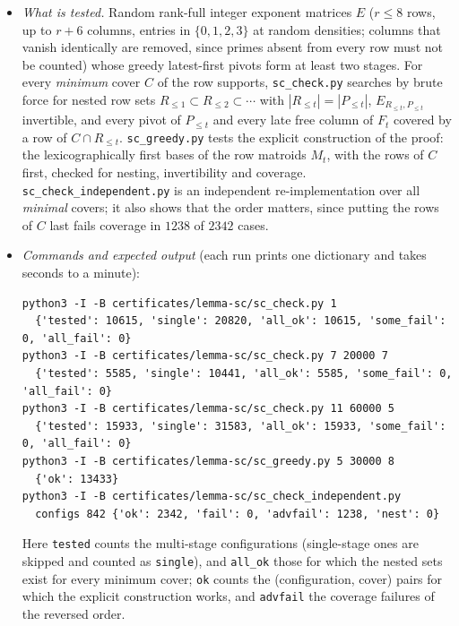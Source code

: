 \begin{itemize}
\item \emph{What is tested.} Random rank-full integer exponent matrices $E$ ($r\le8$ rows, up to $r+6$ columns, entries in
$\{0,1,2,3\}$ at random densities; columns that vanish identically are removed, since primes absent from every row must not be
counted) whose greedy latest-first pivots form at least two stages. For every \emph{minimum} cover $C$ of the row supports,
\texttt{sc\_check.py} searches by brute force for nested row sets $R_{\le1}\subset R_{\le2}\subset\cdots$ with
$|R_{\le t}|=|P_{\le t}|$, $E_{R_{\le t},P_{\le t}}$ invertible, and every pivot of $P_{\le t}$ and every late free column of $F_t$ covered
by a row of $C\cap R_{\le t}$. \texttt{sc\_greedy.py} tests the explicit construction of the proof: the lexicographically first
bases of the row matroids $M_t$, with the rows of $C$ first, checked for nesting, invertibility and coverage.
\texttt{sc\_check\_independent.py} is an independent re-implementation over all \emph{minimal} covers; it also shows that the order
matters, since putting the rows of $C$ last fails coverage in $1238$ of $2342$ cases.
\item \emph{Commands and expected output} (each run prints one dictionary and takes seconds to a minute):
\begingroup\footnotesize
\begin{verbatim}
python3 -I -B certificates/lemma-sc/sc_check.py 1
  {'tested': 10615, 'single': 20820, 'all_ok': 10615, 'some_fail': 0, 'all_fail': 0}
python3 -I -B certificates/lemma-sc/sc_check.py 7 20000 7
  {'tested': 5585, 'single': 10441, 'all_ok': 5585, 'some_fail': 0, 'all_fail': 0}
python3 -I -B certificates/lemma-sc/sc_check.py 11 60000 5
  {'tested': 15933, 'single': 31583, 'all_ok': 15933, 'some_fail': 0, 'all_fail': 0}
python3 -I -B certificates/lemma-sc/sc_greedy.py 5 30000 8
  {'ok': 13433}
python3 -I -B certificates/lemma-sc/sc_check_independent.py
  configs 842 {'ok': 2342, 'fail': 0, 'advfail': 1238, 'nest': 0}
\end{verbatim}
\endgroup
Here \texttt{tested} counts the multi-stage configurations (single-stage ones are skipped and counted as \texttt{single}), and
\texttt{all\_ok} those for which the nested sets exist for every minimum cover; \texttt{ok} counts the (configuration, cover) pairs
for which the explicit construction works, and \texttt{advfail} the coverage failures of the reversed order.
\end{itemize}

